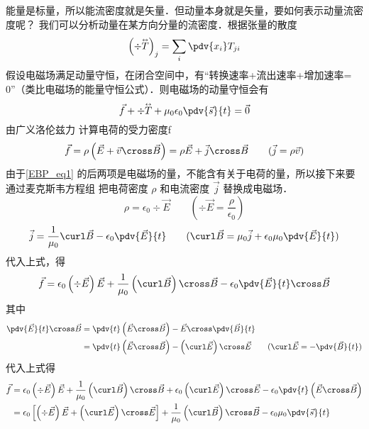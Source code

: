 能量是标量，所以能流密度就是矢量．但动量本身就是矢量，要如何表示动量流密度呢？ 
我们可以分析动量在某方向分量的流密度．根据张量的散度%
\begin{equation}
{\left( {\div \mathord{\buildrel{\lower3pt\hbox{$\scriptscriptstyle\leftrightarrow$}} 
\over T} } \right)_j} = \sum\limits_i {\pdv{x_i} T_{ji}}
\end{equation}
假设电磁场满足动量守恒，在闭合空间中，有“转换速率+流出速率+增加速率= 0”（类比电磁场的能量守恒公式）．则电磁场的动量守恒会有
\begin{equation}\label{EBP_eq1}
\vec f + \div \mathord{\buildrel{\lower3pt\hbox{$\scriptscriptstyle\leftrightarrow$}} 
\over T}  + {\mu _0}{\epsilon_0} \pdv{\vec s}{t} = \vec 0
\end{equation} 
由广义洛伦兹力%
计算电荷的受力密度\vec f %
\begin{equation}
\vec f = \rho \left( {\vec E + \vec v \cross \vec B} \right) = \rho \vec E + \vec j \cross \vec B
\qquad
(\vec j = \rho \vec v)
\end{equation} 
由于\autoref{EBP_eq1} 的后两项是电磁场的量，不能含有关于电荷的量，所以接下来要通过麦克斯韦方程组 %
把电荷密度 $\rho$ 和电流密度 $\vec j$ 替换成电磁场．
\begin{equation}
\rho  = {\epsilon_0}\div \vec E
\qquad
(\div \vec E = \frac{\rho }{{{\epsilon_0}}})
\end{equation}
\begin{equation}
\vec j = \frac{1}{{{\mu _0}}}\curl \vec B - {\epsilon_0} \pdv{\vec E}{t}
\qquad
(\curl \vec B = {\mu _0}\vec j + {\epsilon_0}{\mu _0} \pdv{\vec E}{t})
\end{equation}
代入上式，得
\begin{equation}
\vec f = {\epsilon_0}\left( {\div \vec E} \right)\vec E + \frac{1}{{{\mu _0}}}\left( {\curl \vec B} \right) \cross \vec B - {\epsilon_0} \pdv{\vec E}{t} \cross \vec B
\end{equation} 
其中 
\begin{equation}
\begin{aligned}
\pdv{\vec E}{t} \cross \vec B &= \pdv{t} \left( {\vec E \cross \vec B} \right) - \vec E \cross \pdv{\vec B}{t}\\ 
&= \pdv{t} \left( {\vec E \cross \vec B} \right) - \left( {\curl \vec E} \right) \cross \vec E
\qquad
(\curl \vec E =  - \pdv{\vec B}{t})
\end{aligned}
\end{equation} 
代入上式得
\begin{equation}
\begin{aligned}
\vec f &= {\epsilon_0}\left( {\div \vec E} \right)\vec E + \frac{1}{{{\mu _0}}}\left( {\curl \vec B} \right) \cross \vec B + {\epsilon_0}\left( {\curl \vec E} \right) \cross \vec E - {\epsilon_0}\pdv{t} \left( {\vec E \cross \vec B} \right)\\
&= {\epsilon_0}\left[ {\left( {\div \vec E} \right)\vec E + \left( {\curl \vec E} \right) \cross \vec E} \right] + \frac{1}{{{\mu _0}}}\left( {\curl \vec B} \right) \cross \vec B - {\epsilon_0}{\mu _0}\pdv{\vec s}{t}
\end{aligned}
\end{equation} 

